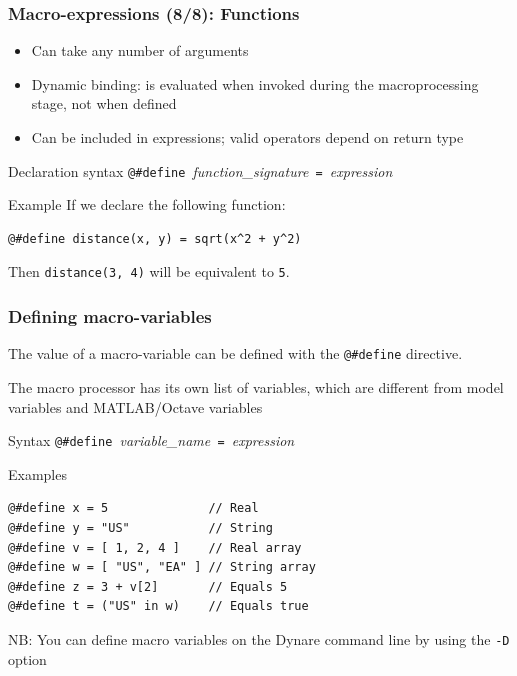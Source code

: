 \documentclass[aspectratio=169]{beamer}
\begin{document}
\begin{frame}[fragile=singleslide]
  \frametitle{Macro-expressions (8/8): Functions}
  \begin{itemize}
  \item Can take any number of arguments
  \item Dynamic binding: is evaluated when invoked during the macroprocessing stage, not when defined
  \item Can be included in expressions; valid operators depend on return type
  \end{itemize}

  \begin{block}{Declaration syntax}
    \verb+@#define +\textit{function\_signature}\verb+ = +\textit{expression}
  \end{block}

  \begin{block}{Example}
If we declare the following function:
\begin{verbatim}
@#define distance(x, y) = sqrt(x^2 + y^2)
\end{verbatim}
Then \texttt{distance(3, 4)} will be equivalent to \texttt{5}.
  \end{block}
\end{frame}

\begin{frame}[fragile=singleslide]
  \frametitle{Defining macro-variables}

  The value of a macro-variable can be defined with the \verb+@#define+
  directive.

  The macro processor has its own list of variables, which are different from model variables and MATLAB/Octave variables

  \begin{block}{Syntax}
    \verb+@#define +\textit{variable\_name}\verb+ = +\textit{expression}
  \end{block}

  \begin{block}{Examples}
\begin{verbatim}
@#define x = 5              // Real
@#define y = "US"           // String
@#define v = [ 1, 2, 4 ]    // Real array
@#define w = [ "US", "EA" ] // String array
@#define z = 3 + v[2]       // Equals 5
@#define t = ("US" in w)    // Equals true
\end{verbatim}
  \end{block}
  NB: You can define macro variables on the Dynare command line by using the \texttt{-D} option
\end{frame}
\end{document}
